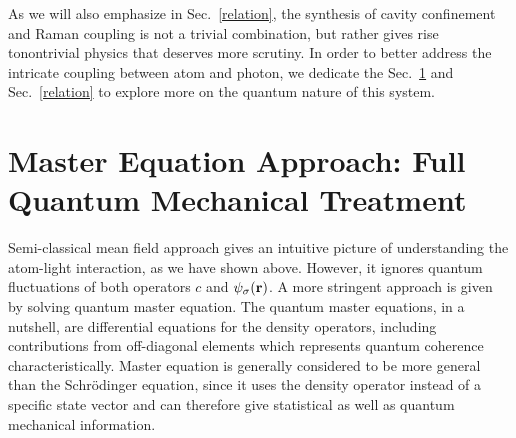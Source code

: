 \documentclass[atoms,article,submit,moreauthors,pdftex,12pt,a4paper]{mdpi}
\begin{document}
As we will also emphasize in Sec.~\ref{relation}, the synthesis of cavity confinement and Raman coupling is not a trivial combination, but rather gives rise tonontrivial physics that deserves more scrutiny. In order to better address the intricate coupling between atom and photon, we dedicate the Sec.~\ref{master} and Sec.~\ref{relation} to explore more on the quantum nature of this system. 

\section{Master Equation Approach: Full Quantum Mechanical Treatment } \label{master}

Semi-classical mean field approach gives an intuitive picture of understanding the atom-light interaction, as we have shown above. However, it ignores quantum fluctuations of both operators $c$ and $\psi_\sigma({\bf r})$. A more stringent approach is given by solving quantum master equation.
The quantum master equations, in a nutshell, are differential equations for the density operators, including contributions from off-diagonal elements which represents quantum coherence characteristically.
Master equation is generally considered to be more general than the Schr\"{o}dinger equation, since it uses the density operator instead of a specific state vector and can therefore give statistical as well as quantum mechanical information. 
\end{document}
